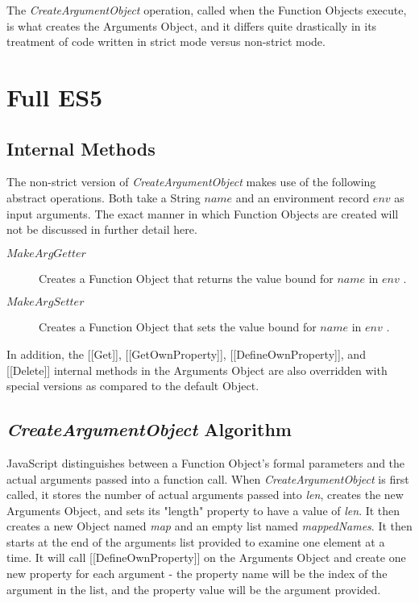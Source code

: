 \documentclass[a4paper,11pt,twoside]{report}
\begin{document}
The \textit{CreateArgumentObject} operation, called when the Function Objects execute, is what creates the Arguments Object, and it differs quite drastically in its treatment of code written in strict mode versus non-strict mode. 

\section{Full ES5}
\subsection{Internal Methods}\label{sec:argobjIM}
The non-strict version of \textit{CreateArgumentObject} makes use of the following abstract operations. Both take a String $name$ and an environment record $env$ as input arguments. The exact manner in which Function Objects are created will not be discussed in further detail here.
\begin{description}
\item[$MakeArgGetter$] Creates a Function Object that returns the value bound for $name$ in $env$ \cite{EcmaScript}.
\item[$MakeArgSetter$] Creates a Function Object that sets the value bound for $name$ in $env$ \cite{EcmaScript}.
\end{description}

In addition, the [[Get]], [[GetOwnProperty]], [[DefineOwnProperty]], and [[Delete]] internal methods in the Arguments Object are also overridden with special versions as compared to the default Object.

\subsection{\textit{CreateArgumentObject} Algorithm}
JavaScript distinguishes between a Function Object's formal parameters and the actual arguments passed into a function call. When \textit{CreateArgumentObject} is first called, it stores the number of actual arguments passed into \textit{len}, creates the new Arguments Object, and sets its "length" property to have a value of \textit{len}. It then creates a new Object named \textit{map} and an empty list named \textit{mappedNames}. It then starts at the end of the arguments list provided to examine one element at a time. It will call [[DefineOwnProperty]] on the Arguments Object and create one new property for each argument - the property name will be the index of the argument in the list, and the property value will be the argument provided. 
\end{document}
